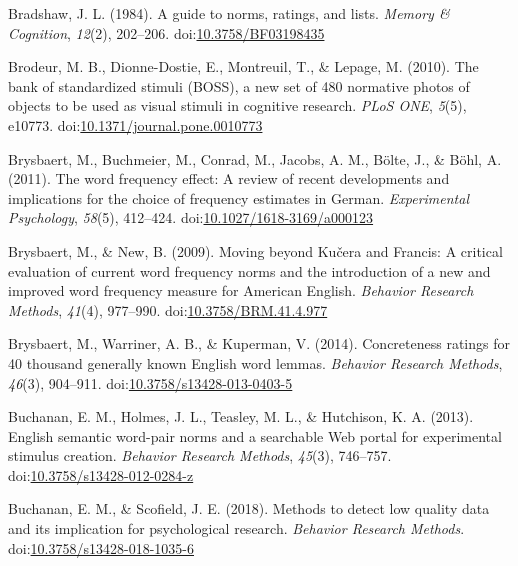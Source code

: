 \documentclass[english,,man]{apa6}
\theoremstyle{definition}
\theoremstyle{definition}
\theoremstyle{definition}
\theoremstyle{remark}
\begin{document}
\leavevmode\hypertarget{ref-Bradshaw1984}{}%
Bradshaw, J. L. (1984). A guide to norms, ratings, and lists.
\emph{Memory \& Cognition}, \emph{12}(2), 202--206.
doi:\href{https://doi.org/10.3758/BF03198435}{10.3758/BF03198435}

\leavevmode\hypertarget{ref-Brodeur2010}{}%
Brodeur, M. B., Dionne-Dostie, E., Montreuil, T., \& Lepage, M. (2010).
The bank of standardized stimuli (BOSS), a new set of 480 normative
photos of objects to be used as visual stimuli in cognitive research.
\emph{PLoS ONE}, \emph{5}(5), e10773.
doi:\href{https://doi.org/10.1371/journal.pone.0010773}{10.1371/journal.pone.0010773}

\leavevmode\hypertarget{ref-Brysbaert2011}{}%
Brysbaert, M., Buchmeier, M., Conrad, M., Jacobs, A. M., Bölte, J., \&
Böhl, A. (2011). The word frequency effect: A review of recent
developments and implications for the choice of frequency estimates in
German. \emph{Experimental Psychology}, \emph{58}(5), 412--424.
doi:\href{https://doi.org/10.1027/1618-3169/a000123}{10.1027/1618-3169/a000123}

\leavevmode\hypertarget{ref-Brysbaert2009}{}%
Brysbaert, M., \& New, B. (2009). Moving beyond Kučera and Francis: A
critical evaluation of current word frequency norms and the introduction
of a new and improved word frequency measure for American English.
\emph{Behavior Research Methods}, \emph{41}(4), 977--990.
doi:\href{https://doi.org/10.3758/BRM.41.4.977}{10.3758/BRM.41.4.977}

\leavevmode\hypertarget{ref-Brysbaert2013}{}%
Brysbaert, M., Warriner, A. B., \& Kuperman, V. (2014). Concreteness
ratings for 40 thousand generally known English word lemmas.
\emph{Behavior Research Methods}, \emph{46}(3), 904--911.
doi:\href{https://doi.org/10.3758/s13428-013-0403-5}{10.3758/s13428-013-0403-5}

\leavevmode\hypertarget{ref-Buchanan2013}{}%
Buchanan, E. M., Holmes, J. L., Teasley, M. L., \& Hutchison, K. A.
(2013). English semantic word-pair norms and a searchable Web portal for
experimental stimulus creation. \emph{Behavior Research Methods},
\emph{45}(3), 746--757.
doi:\href{https://doi.org/10.3758/s13428-012-0284-z}{10.3758/s13428-012-0284-z}

\leavevmode\hypertarget{ref-Buchanan2018}{}%
Buchanan, E. M., \& Scofield, J. E. (2018). Methods to detect low
quality data and its implication for psychological research.
\emph{Behavior Research Methods}.
doi:\href{https://doi.org/10.3758/s13428-018-1035-6}{10.3758/s13428-018-1035-6}
\end{document}
